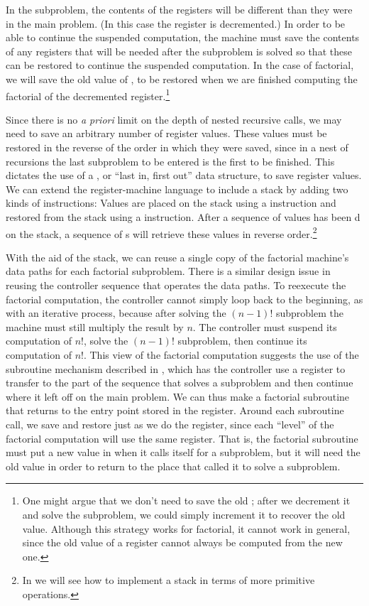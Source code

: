 \enlargethispage{\baselineskip}

In the subproblem, the contents of the registers will be different than they
were in the main problem. (In this case the  register is decremented.)
In order to be able to continue the suspended computation, the machine must
save the contents of any registers that will be needed after the subproblem is
solved so that these can be restored to continue the suspended computation.  In
the case of factorial, we will save the old value of , to be restored
when we are finished computing the factorial of the decremented 
register.\footnote{One might argue that we don't need to save the old ;
after we decrement it and solve the subproblem, we could simply increment it to
recover the old value.  Although this strategy works for factorial, it cannot
work in general, since the old value of a register cannot always be computed
from the new one.}

Since there is no \emph{a priori} limit on the depth of nested recursive calls,
we may need to save an arbitrary number of register values.  These values must
be restored in the reverse of the order in which they were saved, since in a
nest of recursions the last subproblem to be entered is the first to be
finished.  This dictates the use of a , or ``last in, first
out'' data structure, to save register values.  We can extend the
register-machine language to include a stack by adding two kinds of
instructions: Values are placed on the stack using a  instruction
and restored from the stack using a  instruction.  After a
sequence of values has been d on the stack, a sequence of
s will retrieve these values in reverse order.\footnote{In
 we will see how to implement a stack in terms of more
primitive operations.}

With the aid of the stack, we can reuse a single copy of the factorial
machine's data paths for each factorial subproblem.  There is a similar design
issue in reusing the controller sequence that operates the data paths.  To
reexecute the factorial computation, the controller cannot simply loop back to
the beginning, as with an iterative process, because after solving the
\( (n - 1)! \) subproblem the machine must still multiply the result by \( n \).  The
controller must suspend its computation of \( n! \), solve the \( (n - 1)! \)
subproblem, then continue its computation of \( n! \).  This view of the
factorial computation suggests the use of the subroutine mechanism described in
, which has the controller use a  register to
transfer to the part of the sequence that solves a subproblem and then continue
where it left off on the main problem.  We can thus make a factorial subroutine
that returns to the entry point stored in the  register.  Around
each subroutine call, we save and restore  just as we do the
 register, since each ``level'' of the factorial computation will use
the same  register.  That is, the factorial subroutine must put
a new value in  when it calls itself for a subproblem, but it
will need the old value in order to return to the place that called it to solve
a subproblem.

